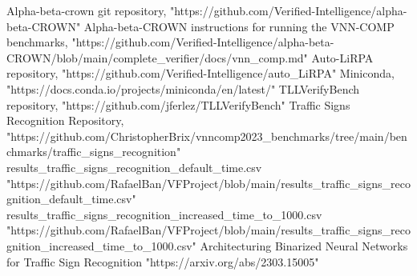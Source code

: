 \documentclass[12pt,a4paper]{report}
\begin{document}
\begin{thebibliography}{1}
 Alpha-beta-crown git repository, "https://github.com/Verified-Intelligence/alpha-beta-CROWN"
 Alpha-beta-CROWN instructions for running the VNN-COMP benchmarks, "https://github.com/Verified-Intelligence/alpha-beta-CROWN/blob/main/complete\_verifier/docs/vnn\_comp.md"
 Auto-LiRPA repository, "https://github.com/Verified-Intelligence/auto\_LiRPA"
 Miniconda, "https://docs.conda.io/projects/miniconda/en/latest/"
 TLLVerifyBench repository, "https://github.com/jferlez/TLLVerifyBench"
 Traffic Signs Recognition Repository, "https://github.com/ChristopherBrix/vnncomp2023\_benchmarks/tree/main/benchmarks/traffic\_signs\_recognition"
 results\_traffic\_signs\_recognition\_default\_time.csv
"https://github.com/RafaelBan/VFProject/blob/main/results\_traffic\_signs\_recognition\_default\_time.csv"
 results\_traffic\_signs\_recognition\_increased\_time\_to\_1000.csv
"https://github.com/RafaelBan/VFProject/blob/main/results\_traffic\_signs\_recognition\_increased\_time\_to\_1000.csv"
Architecturing Binarized Neural Networks for Traffic Sign Recognition
"https://arxiv.org/abs/2303.15005"
\end{thebibliography}
\end{document}

